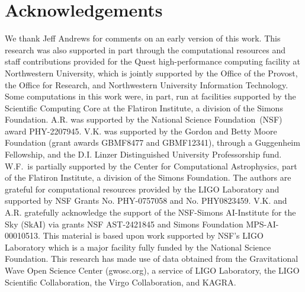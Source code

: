 \documentclass[modern]{aastex631}
\newcommand{\todo}[1]{\textcolor{red}{TODO: #1}}
\begin{document}

\label{sec:conclusion}
\section{Acknowledgements}
\begin{acknowledgments}
    We thank Jeff Andrews for comments on an early version of this work. This
research was also supported in part through the computational resources and
staff contributions provided for the Quest high-performance computing facility
at Northwestern University, which is jointly supported by the Office of the
Provost, the Office for Research, and Northwestern University Information
Technology.   Some computations in this work were, in part, run at facilities
supported by the Scientific Computing Core at the Flatiron Institute, a division
of the Simons Foundation.  A.R. was supported by the National Science
Foundation~(NSF) award PHY-2207945. V.K. was supported by the Gordon and Betty
Moore Foundation (grant awards GBMF8477 and GBMF12341), through a Guggenheim
Fellowship, and the D.I. Linzer Distinguished University Professorship fund.
W.F.~is partially supported by the Center for Computational Astrophysics, part
of the Flatiron Institute, a division of the Simons Foundation.  The authors are
grateful for computational resources provided by the LIGO Laboratory and
supported by NSF Grants No. PHY-0757058 and No. PHY0823459. V.K. and A.R.
gratefully acknowledge the support of the NSF-Simons AI-Institute for the Sky
(SkAI) via grants NSF AST-2421845 and Simons Foundation MPS-AI-00010513. This
material is based upon work supported by NSF’s LIGO Laboratory which is a major
facility fully funded by the National Science Foundation. This research has made
use of data obtained from the Gravitational Wave Open Science Center
(gwosc.org), a service of LIGO Laboratory, the LIGO Scientific Collaboration,
the Virgo Collaboration, and KAGRA. 
\end{acknowledgments}


\clearpage


\end{document}
